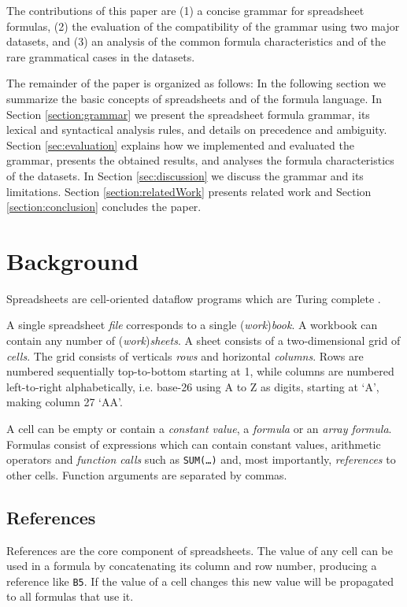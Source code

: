 \documentclass[conference]{IEEEtran}
\begin{document}
The contributions of this paper are (1) a concise grammar for spreadsheet formulas, (2) the evaluation of the compatibility of the grammar using two major datasets, and (3) an analysis of the common formula characteristics and of the rare grammatical cases in the datasets.

The remainder of the paper is organized as follows: In the following section we summarize the basic concepts of spreadsheets and of the formula language. In Section \ref{section:grammar} we present the spreadsheet formula grammar, its lexical and syntactical analysis rules, and details on precedence and ambiguity. Section \ref{sec:evaluation} explains how we implemented and evaluated the grammar, presents the obtained results, and analyses the formula characteristics of the datasets. In Section \ref{sec:discussion} we discuss the grammar and its limitations. Section \ref{section:relatedWork} presents related work and Section \ref{section:conclusion} concludes the paper.

\section{Background}

Spreadsheets are cell-oriented dataflow programs which are Turing complete \cite{ExcelTuringComplete}.

A single spreadsheet \emph{file} corresponds to a single (\emph{work})\emph{book}.
A workbook can contain any number of (\emph{work})\emph{sheets}.
A sheet consists of a two-dimensional grid of \emph{cells}.
The grid consists of verticals \emph{rows} and horizontal \emph{columns}.
Rows are numbered sequentially top-to-bottom starting at 1, while columns are numbered left-to-right alphabetically, i.e. base-26 using A to Z as digits, starting at `A', making column 27 `AA'.

A cell can be empty or contain a \emph{constant value}, a \emph{formula} or an \emph{array formula}.
Formulas consist of expressions which can contain constant values, arithmetic operators and \emph{function calls} such as \texttt{SUM(\ldots)} and, most importantly, \emph{references} to other cells.
Function arguments are separated by commas.

\subsection{References}
References are the core component of spreadsheets.
The value of any cell can be used in a formula by concatenating its column and row number, producing a reference like \texttt{B5}.
If the value of a cell changes this new value will be propagated to all formulas that use it.
\end{document}
